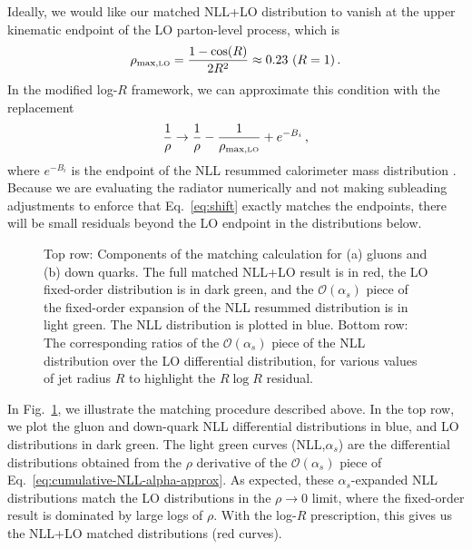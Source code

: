 \documentclass[letterpaper,11pt]{article}
\newcommand{\Fig}[1]{Fig.~\ref{#1}}
\newcommand{\Eq}[1]{Eq.~\eqref{#1}}
\begin{document}
Ideally, we would like our matched NLL+LO distribution to vanish at the upper kinematic endpoint of the LO parton-level process, which is 
\begin{equation}
\label{eq:rho-max}
\rho_{\mbox{\scriptsize max,\tiny LO}} = \frac{1-\cos(R)}{2R^2} \approx 0.23 \ (R=1)\,.
\end{equation}
In the modified log-$R$ framework, we can approximate this condition with the replacement
\begin{equation}
\label{eq:shift}
\frac{1}{\rho} \rightarrow \frac{1}{\rho} - \frac{1}{\rho_{\mbox{\scriptsize max,\tiny LO}}} + e^{-B_i}\,,
\end{equation}
where $e^{-B_i}$ is the endpoint of the NLL resummed calorimeter mass distribution \cite{Marzani:2017mva,Marzani:2017kqd}.
%
Because we are evaluating the radiator numerically and not making subleading adjustments to enforce that \Eq{eq:shift} exactly matches the endpoints, there will be small residuals beyond the LO endpoint in the distributions below.


\begin{figure}[t]
	\centering

	\caption{\label{fig:calculation-nogroom} Top row: Components of the matching calculation for (a) gluons and (b) down quarks. The full matched NLL+LO result is in red, the LO fixed-order distribution is in dark green, and the $\mathcal{O}(\alpha_s)$ piece of the fixed-order expansion of the NLL resummed distribution is in light green. The NLL distribution is plotted in blue. Bottom row: The corresponding ratios of the $\mathcal{O}(\alpha_s)$ piece of the NLL distribution over the LO differential distribution, for various values of jet radius $R$ to highlight the $R \log R$ residual.}
\end{figure}



In \Fig{fig:calculation-nogroom}, we illustrate the matching procedure described above. 
%
In the top row, we plot the gluon and down-quark NLL differential distributions in blue, and LO distributions in dark green. 
%
The light green curves (NLL,$\alpha_s$) are the differential distributions obtained from the $\rho$ derivative of the $\mathcal{O}(\alpha_s)$ piece of \Eq{eq:cumulative-NLL-alpha-approx}. 
%
As expected, these $\alpha_s$-expanded NLL distributions match the LO distributions in the $\rho\rightarrow 0$ limit, where the fixed-order result is dominated by large logs of $\rho$. 
%
With the log-$R$ prescription, this gives us the NLL+LO matched distributions (red curves). 
\end{document}
